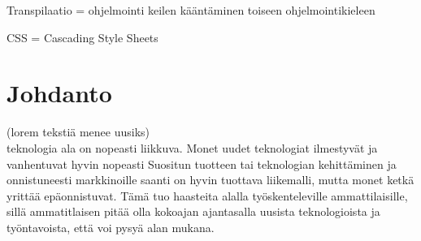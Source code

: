 \documentclass[11pt,a4paper,titlepage,oneside]{article}
\begin{document}
Transpilaatio = ohjelmointi keilen kääntäminen toiseen ohjelmointikieleen
\bigskip

CSS = Cascading Style Sheets
\bigskip



\newpage





\clearpage
\setcounter{page}{1}

\pagestyle{fancy}
\lfoot{}
\cfoot{}
\rfoot{}
\lhead{}
\chead{}
\rhead{\thepage}
\renewcommand{\headrulewidth}{0pt}
\renewcommand{\footrulewidth}{0pt}











\section{Johdanto}              %


















(lorem tekstiä menee uusiks)\\ %
teknologia ala on nopeasti liikkuva. 
Monet uudet teknologiat ilmestyvät ja vanhentuvat hyvin nopeasti
Suositun tuotteen tai teknologian kehittäminen ja onnistuneesti markkinoille saanti on hyvin tuottava liikemalli, 
mutta monet ketkä yrittää epäonnistuvat.\citemissing
Tämä tuo haasteita alalla työskenteleville ammattilaisille, 
sillä ammatitlaisen pitää olla kokoajan ajantasalla uusista teknologioista ja työntavoista, että voi pysyä alan mukana.
\end{document}
